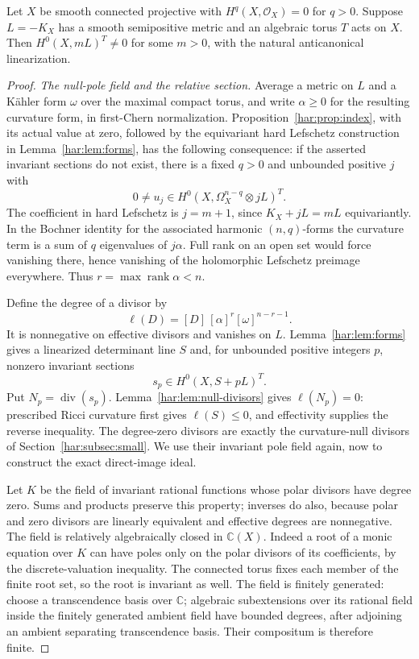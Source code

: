 \begin{proposition}
\label{inj:degree-zero-route}
Let $X$ be smooth connected projective with
$H^q(X,\mathcal O_X)=0$ for $q>0$.  Suppose $L=-K_X$ has a smooth
semipositive metric and an algebraic torus $T$ acts on $X$.
Then $H^0(X,mL)^T\ne0$ for some $m>0$, with the natural
anticanonical linearization.
\end{proposition}

\begin{proof}
\smallskip\noindent\textit{The null-pole field and the relative section.}
Average a metric on $L$ and a K\"ahler form $\omega$ over the maximal
compact torus, and write $\alpha\ge0$ for the resulting curvature
form, in first-Chern normalization.  Proposition~\ref{har:prop:index}, with its actual value at zero,
followed by the equivariant hard Lefschetz construction in
Lemma~\ref{har:lem:forms},
has the following consequence: if the asserted invariant sections do
not exist, there is a fixed $q>0$ and unbounded positive $j$ with
\[
 0\ne u_j\in H^0(X,\Omega_X^{n-q}\otimes jL)^T.
\]
The coefficient in hard Lefschetz is $j=m+1$, since
$K_X+jL=mL$ equivariantly.  In the Bochner identity for the associated
harmonic $(n,q)$-forms the curvature term is a sum of $q$ eigenvalues
of $j\alpha$.  Full rank on an open set would force vanishing there,
hence vanishing of the holomorphic Lefschetz preimage everywhere.
Thus $r=\max\operatorname{rank}\alpha<n$.

Define the degree of a divisor by
\[
 \ell(D)=[D]\,[\alpha]^r[\omega]^{n-r-1}.
\]
It is nonnegative on effective divisors and vanishes on $L$.
Lemma~\ref{har:lem:forms} gives a linearized determinant line $S$
and, for unbounded positive integers $p$, nonzero invariant sections
\[
 s_p\in H^0(X,S+pL)^T.
\]
Put $N_p=\operatorname{div}(s_p)$. Lemma~\ref{har:lem:null-divisors}
gives $\ell(N_p)=0$: prescribed Ricci curvature first gives
$\ell(S)\le0$, and effectivity supplies the reverse inequality.
The degree-zero divisors are exactly the curvature-null divisors
of Section~\ref{har:subsec:small}. We use their invariant pole field
again, now to construct the exact direct-image ideal.

Let $K$ be the field of invariant rational functions whose polar
divisors have degree zero.  Sums and products preserve this property;
inverses do also, because polar and zero divisors are linearly
equivalent and effective degrees are nonnegative.  The field is
relatively algebraically closed in $\mathbb C(X)$.  Indeed a root
of a monic equation over $K$ can have poles only on the polar
divisors of its coefficients, by the discrete-valuation inequality.
The connected torus fixes each member of the finite root set, so the
root is invariant as well.  The field is finitely generated: choose
a transcendence basis over $\mathbb C$; algebraic subextensions
over its rational field inside the finitely generated ambient field
have bounded degrees, after adjoining an ambient separating
transcendence basis.  Their compositum is therefore finite.


\end{proof}
